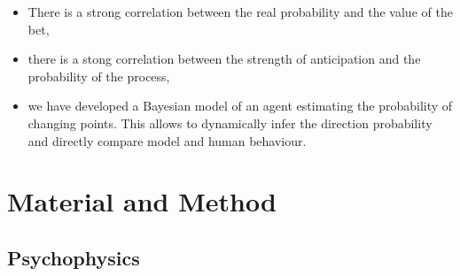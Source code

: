 \documentclass[profile,final,english,draft]{article}%
\begin{document}
\begin{itemize}\setlength{\itemsep}{0ex}
\item There is a strong correlation between the real probability and the value of the bet,

\item there is a stong correlation between the strength of anticipation and the probability of the process,

\item we have developed a Bayesian model of an agent estimating the probability of changing points. This allows to dynamically infer the direction probability and directly compare model and human behaviour.

%

\end{itemize}
\section{Material and Method}
\subsection{Psychophysics}



\end{document}
